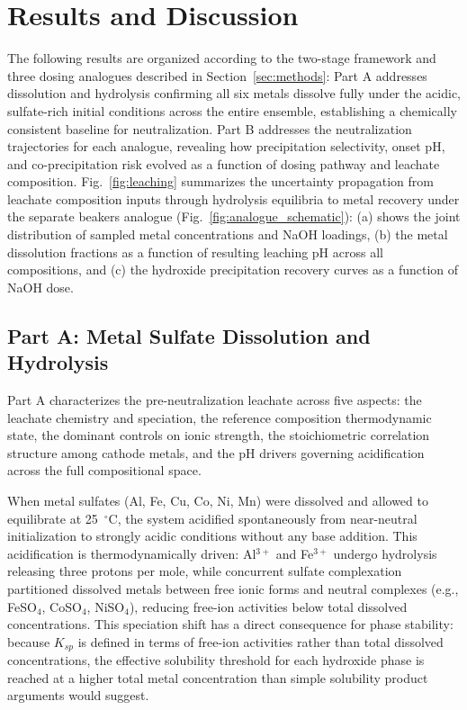\documentclass[final,2p,times]{elsarticle}
\begin{document}

\section{Results and Discussion}\label{sec:results}


The following results are organized according to the two-stage framework and three dosing analogues described in Section~\ref{sec:methods}: Part A addresses dissolution and hydrolysis confirming all six metals dissolve fully under the acidic, sulfate-rich initial conditions across the entire ensemble, establishing a chemically consistent baseline for neutralization. Part B addresses the neutralization trajectories for each analogue, revealing how precipitation selectivity, onset pH, and co-precipitation risk evolved as a function of dosing pathway and leachate composition. Fig.~\ref{fig:leaching} summarizes the uncertainty propagation from leachate composition inputs through hydrolysis equilibria to metal recovery under the separate beakers analogue (Fig.~\ref{fig:analogue_schematic}): (a) shows the joint distribution of sampled metal concentrations and NaOH loadings, (b) the metal dissolution fractions as a function of resulting leaching pH across all compositions, and (c) the hydroxide precipitation recovery curves as a function of NaOH dose.

\subsection{Part A: Metal Sulfate Dissolution and Hydrolysis}

Part A characterizes the pre-neutralization leachate across five aspects: the leachate chemistry and speciation, the reference composition thermodynamic state, the dominant controls on ionic strength, the stoichiometric correlation structure among cathode metals, and the pH drivers governing acidification across the full compositional space.

When metal sulfates (Al, Fe, Cu, Co, Ni, Mn) were dissolved and allowed to equilibrate at 25~$^\circ$C, the system acidified spontaneously from near-neutral initialization to strongly acidic conditions without any base addition. This acidification is thermodynamically driven: Al$^{3+}$ and Fe$^{3+}$ undergo hydrolysis releasing three protons per mole, while concurrent sulfate complexation partitioned dissolved metals between free ionic forms and neutral complexes (e.g., FeSO$_4$, CoSO$_4$, NiSO$_4$), reducing free-ion activities below total dissolved concentrations. This speciation shift has a direct consequence for phase stability: because $K_{sp}$ is defined in terms of free-ion activities rather than total dissolved concentrations, the effective solubility threshold for each hydroxide phase is reached at a higher total metal concentration than simple solubility product arguments would suggest.
\end{document}
